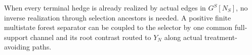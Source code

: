 When every terminal hedge is already realized by actual edges in \(G^S[N_S]\), no inverse realization through selection ancestors is needed. A positive finite multistate forest separator can be coupled to the selector by one common full-support channel and its root contrast routed to \(Y_N\) along actual treatment-avoiding paths.